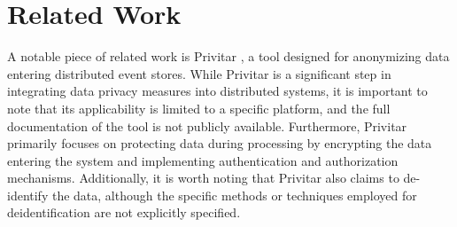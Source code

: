 \chapter{Related Work\label{cha:chapter6}}

A notable piece of related work is Privitar \cite{privitar}, a tool designed for anonymizing data entering distributed event stores. While Privitar is a significant step in integrating data privacy measures into distributed systems, it is important to note that its applicability is limited to a specific platform, and the full documentation of the tool is not publicly available. Furthermore, Privitar primarily focuses on protecting data during processing by encrypting the data entering the system and implementing authentication and authorization mechanisms. Additionally, it is worth noting that Privitar also claims to de-identify the data, although the specific methods or techniques employed for deidentification are not explicitly specified. 

